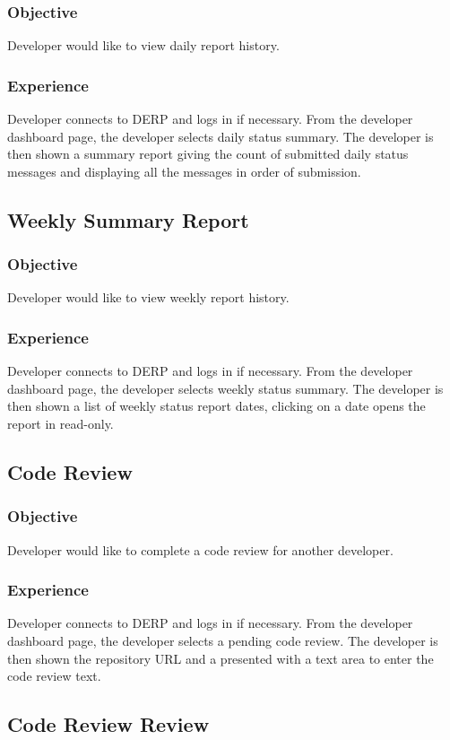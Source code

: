 \subsubsection*{Objective}
Developer would like to view daily report history.
\subsubsection*{Experience}
Developer connects to DERP and logs in if necessary. From the developer dashboard page, the developer selects daily status summary. The developer is then shown a summary report giving the count of submitted daily status messages and displaying all the messages in order of submission.


\subsection*{Weekly Summary Report}
\subsubsection*{Objective}
Developer would like to view weekly report history.
\subsubsection*{Experience}
Developer connects to DERP and logs in if necessary. From the developer dashboard page, the developer selects weekly status summary. The developer is then shown a list of weekly status report dates, clicking on a date opens the report in read-only.


\subsection*{Code Review}
\subsubsection*{Objective}
Developer would like to complete a code review for another developer.
\subsubsection*{Experience}
Developer connects to DERP and logs in if necessary. From the developer dashboard page, the developer selects a pending code review. The developer is then shown the repository URL and a presented with a text area to enter the code review text.


\subsection*{Code Review Review}
